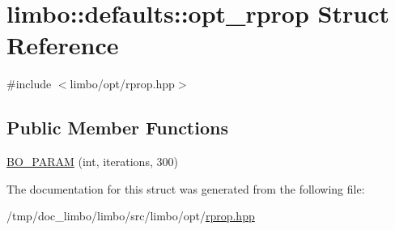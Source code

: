 \hypertarget{structlimbo_1_1defaults_1_1opt__rprop}{}\section{limbo\+:\+:defaults\+:\+:opt\+\_\+rprop Struct Reference}
\label{structlimbo_1_1defaults_1_1opt__rprop}


{\ttfamily \#include $<$limbo/opt/rprop.\+hpp$>$}

\subsection*{Public Member Functions}
\begin{DoxyCompactItemize}
\item 
\hyperlink{group__opt__defaults_gadf6a8058cda20130ad992631e561eb5a}{B\+O\+\_\+\+P\+A\+R\+A\+M} (int, iterations, 300)
\end{DoxyCompactItemize}


The documentation for this struct was generated from the following file\+:\begin{DoxyCompactItemize}
\item 
/tmp/doc\+\_\+limbo/limbo/src/limbo/opt/\hyperlink{rprop_8hpp}{rprop.\+hpp}\end{DoxyCompactItemize}
